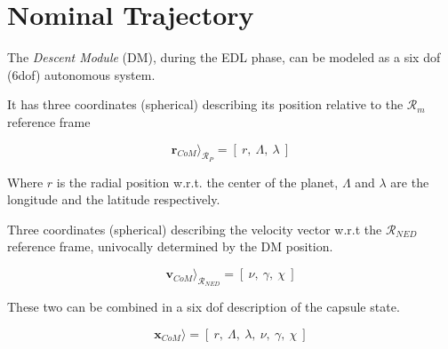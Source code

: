 \chapter{Nominal Trajectory}

The \textit{Descent Module} (DM), during the EDL phase, can be modeled as a
six dof (6dof) autonomous system.

It has three coordinates (spherical) describing its position relative to the
$\mathcal{R}_{m}$ reference frame

        $$
            \textbf{r}_{CoM}\rangle_{\mathcal{R}_{P}} = [\: r,\:\Lambda,\:\lambda \:]
        $$

\noindent Where $r$ is the radial position w.r.t. the center of the planet, $\Lambda$ and $\lambda$ are 
the longitude and the latitude respectively.

Three coordinates (spherical) describing the velocity vector w.r.t the $\mathcal{R}_{NED}$ reference frame, univocally
determined by the DM position.

        $$
            \textbf{v}_{CoM}\rangle_{\mathcal{R}_{NED}} = [\: \nu,\:\gamma,\:\chi \:]
        $$

These two can be combined in a six dof description of the capsule state.

        $$
            \textbf{x}_{CoM}\rangle = [\: r,\:\Lambda,\:\lambda, \: \nu,\:\gamma,\:\chi \:]
        $$